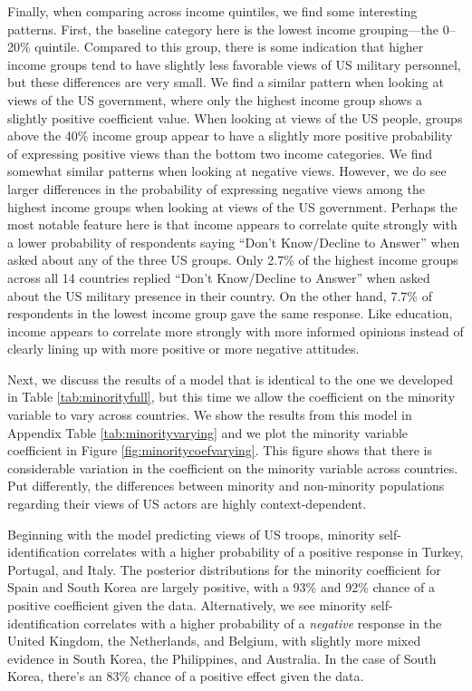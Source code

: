 Finally, when comparing across income quintiles, we find some interesting patterns. First, the baseline category here is the lowest income grouping---the 0--20\% quintile. Compared to this group, there is some indication that higher income groups tend to have slightly less favorable views of US military personnel, but these differences are very small. We find a similar pattern when looking at views of the US government, where only the highest income group shows a slightly positive coefficient value. When looking at views of the US people, groups above the 40\% income group appear to have a slightly more positive probability of expressing positive views than the bottom two income categories. We find somewhat similar patterns when looking at negative views. However, we do see larger differences in the probability of expressing negative views among the highest income groups when looking at views of the US government. Perhaps the most notable feature here is that income appears to correlate quite strongly with a lower probability of respondents saying ``Don't Know/Decline to Answer'' when asked about any of the three US groups. Only 2.7\% of the highest income groups across all 14 countries replied ``Don't Know/Decline to Answer'' when asked about the US military presence in their country. On the other hand, 7.7\% of respondents in the lowest income group gave the same response. Like education, income appears to correlate more strongly with more informed opinions instead of clearly lining up with more positive or more negative attitudes. 

Next, we discuss the results of a model that is identical to the one we developed in Table \ref{tab:minorityfull}, but this time we allow the coefficient on the minority variable to vary across countries. We show the results from this model in Appendix Table \ref{tab:minorityvarying} and we plot the minority variable coefficient in Figure \ref{fig:minoritycoefvarying}. This figure shows that there is considerable variation in the coefficient on the minority variable across countries. Put differently, the differences between minority and non-minority populations regarding their views of US actors are highly context-dependent. 

Beginning with the model predicting views of US troops, minority self-identification correlates with a higher probability of a positive response in Turkey, Portugal, and Italy. The posterior distributions for the minority coefficient for Spain and South Korea are largely positive, with a 93\% and 92\% chance of a positive coefficient given the data. Alternatively, we see minority self-identification correlates with a higher probability of a \textit{negative} response in the United Kingdom, the Netherlands, and Belgium, with slightly more mixed evidence in South Korea, the Philippines, and Australia. In the case of South Korea, there's an 83\% chance of a positive effect given the data.

